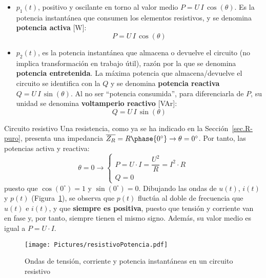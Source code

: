 \documentclass[11pt]{book} %
\makeatletter
\numberwithin{dummy}{section}
\theoremstyle{ocrenumbox}
\theoremstyle{blacknumex}
\theoremstyle{blacknumbox}
\theoremstyle{ocrenum}
\renewcommand{\subsection}{\@startsection {subsection}{2}{\z@}
{-3ex \@plus -0.1ex \@minus -.4ex}
{0.5ex \@plus.2ex }
{\normalfont\sffamily\bfseries}}
\makeatother
\begin{document}
	\begin{itemize}
		\item $p_1(t)$, positivo y oscilante en torno al valor medio $P=U\,I\,\cos(\theta)$. Es la potencia instantánea que consumen los elementos resistivos, y se denomina \textbf{potencia activa} [W]:
		\begin{equation}
			\boxed{P=U\,I\,\cos(\theta)}
		\end{equation}
		\item $p_2(t)$, es la potencia instantánea que almacena o devuelve el circuito (no implica transformación en trabajo útil), razón por la que se denomina \textbf{potencia entretenida}. La máxima potencia que almacena/devuelve el circuito se identifica con la $Q$ y se denomina \textbf{potencia reactiva} $Q=U\,I\,\sin(\theta)$. Al no ser ``potencia consumida'', para diferenciarla de $P$, su unidad se denomina \textbf{voltamperio reactivo} [VAr]:
		\begin{equation}
			\boxed{Q=U\,I\,\sin(\theta)}
		\end{equation}
	\end{itemize}
	
	\subsection{Circuito resistivo}\label{sec.potencia_R}
	Una resistencia, como ya se ha indicado en la Sección~\ref{sec.R-puro}, presenta una impedancia $\overline{Z_R}=R\phase{0^\circ}\rightarrow \theta=0^\circ$. Por tanto, las potencias activa y reactiva: 
	\begin{equation}
		\theta = 0 \rightarrow
		\boxed{\begin{cases}
				P = U\cdot I = \dfrac{U^2}{R} = I^2\cdot R\\
				Q = 0
		\end{cases}}
	\end{equation}
	puesto que $\cos(0^\circ)=1$ y $\sin(0^\circ)=0$. Dibujando las ondas de $u(t)$, $i(t)$ y $p(t)$ (Figura~\ref{fig.resistivoPotencia}), se observa que $p(t)$ fluctúa al doble de frecuencia que $u(t)$ e $i(t)$, y que \textbf{siempre es positiva}, puesto que tensión y corriente van en fase y, por tanto, siempre tienen el mismo signo. Además, su valor medio es igual a $P=U\cdot I$.
	\begin{figure}[htbp]
		\centering
		\texttt{[image: Pictures/resistivoPotencia.pdf]}
		\caption{Ondas de tensión, corriente y potencia instantáneas en un circuito resistivo}
		\label{fig.resistivoPotencia}
	\end{figure}
	
\end{document}
